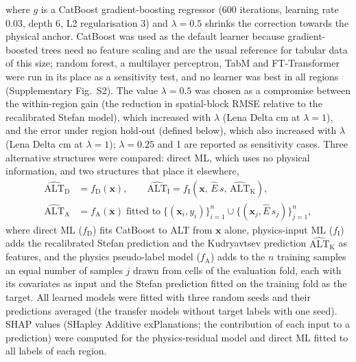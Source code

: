 where $g$ is a CatBoost gradient-boosting regressor\cite{Prokhorenkova2018} (600 iterations, learning rate 0.03, depth 6, L2 regularisation 3) and $\lambda=0.5$ shrinks the correction towards the physical anchor. CatBoost was used as the default learner because gradient-boosted trees need no feature scaling and are the usual reference for tabular data of this size\cite{Grinsztajn2022}; random forest, a multilayer perceptron, TabM and FT-Transformer\cite{Gorishniy2021,Gorishniy2025,Holzmuller2024} were run in its place as a sensitivity test, and no learner was best in all regions (Supplementary Fig.~S2). The value $\lambda=0.5$ was chosen as a compromise between the within-region gain (the reduction in spatial-block RMSE relative to the recalibrated Stefan model), which increased with $\lambda$ (Lena Delta \ndlamOneLeblk{} cm at $\lambda=1$), and the error under region hold-out (defined below), which also increased with $\lambda$ (Lena Delta \ndlamOneLereg{} cm at $\lambda=1$); $\lambda = 0.25$ and 1 are reported as sensitivity cases. Three alternative structures were compared: direct ML, which uses no physical information, and two structures that place it elsewhere,
\begin{equation}
\begin{aligned}
\widehat{\mathrm{ALT}}_{\mathrm{D}} &= f_{\mathrm{D}}(\mathbf{x}), \qquad
\widehat{\mathrm{ALT}}_{\mathrm{I}} = f_{\mathrm{I}}\!\left(\mathbf{x},\, \hat{E}\,s,\, \widehat{\mathrm{ALT}}_{\mathrm{K}}\right), \\
\widehat{\mathrm{ALT}}_{\mathrm{A}} &= f_{\mathrm{A}}(\mathbf{x}) \;\text{fitted to}\; \{(\mathbf{x}_i, y_i)\}_{i=1}^{n} \cup \{(\mathbf{x}_j, \hat{E}\,s_j)\}_{j=1}^{n},
\end{aligned}
\label{eq:alt}
\end{equation}
where direct ML ($f_{\mathrm{D}}$) fits CatBoost to ALT from $\mathbf{x}$ alone, physics-input ML ($f_{\mathrm{I}}$) adds the recalibrated Stefan prediction and the Kudryavtsev\cite{Kudryavtsev1974} prediction $\widehat{\mathrm{ALT}}_{\mathrm{K}}$ as features, and the physics pseudo-label model ($f_{\mathrm{A}}$) adds to the $n$ training samples an equal number of samples $j$ drawn from cells of the evaluation fold, each with its covariates as input and the Stefan prediction fitted on the training fold as the target. All learned models were fitted with three random seeds and their predictions averaged (the transfer models without target labels with one seed). SHAP values (SHapley Additive exPlanations; the contribution of each input to a prediction)\cite{Lundberg2017} were computed for the physics-residual model and direct ML fitted to all labels of each region.

